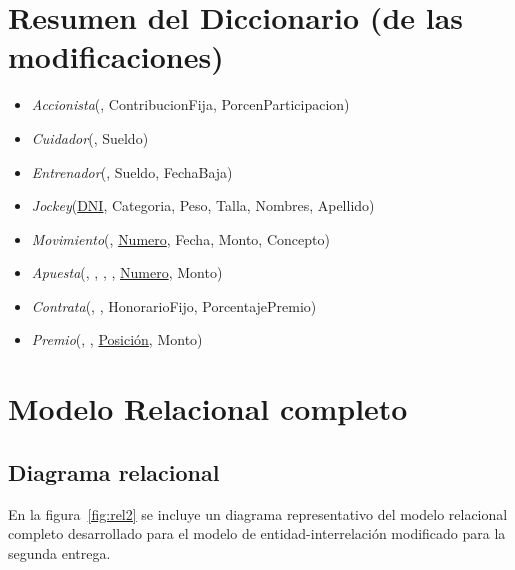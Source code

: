 \documentclass[a4paper,11pt]{article}
\begin{document}
\section{Resumen del Diccionario (de las modificaciones)}

\begin{itemize}

  \item \emph{Accionista}(\uline{}, ContribucionFija,
    PorcenParticipacion)

  \item \emph{Cuidador}(\uline{}, Sueldo)

  \item \emph{Entrenador}(\uline{}, Sueldo, FechaBaja)

  \item \emph{Jockey}(\uline{DNI}, Categoria, Peso, Talla, Nombres, Apellido)

  \item \emph{Movimiento}(\uline{}, \uline{Numero},
    Fecha, Monto, Concepto)

  \item \emph{Apuesta}(\uline{},
    \uline{}, \uline{},
    \uline{}, \uline{Numero}, Monto)

  \item \emph{Contrata}(\uline{},
    \uline{}, HonorarioFijo, PorcentajePremio)

  \item \emph{Premio}(\uline{},
    \uline{}, \uline{Posición}, Monto)

\end{itemize}

\section{Modelo Relacional completo}

\subsection{Diagrama relacional}

En la figura~\ref{fig:rel2} se incluye un diagrama representativo del
modelo relacional completo desarrollado para el modelo de entidad-interrelación
modificado para la segunda entrega.
\end{document}
